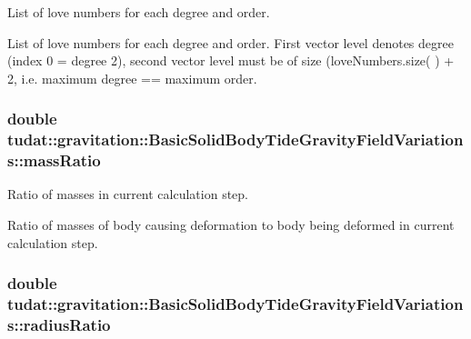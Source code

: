 List of love numbers for each degree and order. 

List of love numbers for each degree and order. First vector level denotes degree (index 0 = degree 2), second vector level must be of size (love\+Numbers.\+size( ) + 2, i.\+e. maximum degree == maximum order. 
\subsubsection[{\texorpdfstring{mass\+Ratio}{massRatio}}]{\setlength{\rightskip}{0pt plus 5cm}double tudat\+::gravitation\+::\+Basic\+Solid\+Body\+Tide\+Gravity\+Field\+Variations\+::mass\+Ratio\hspace{0.3cm}{\ttfamily [protected]}}\hypertarget{classtudat_1_1gravitation_1_1BasicSolidBodyTideGravityFieldVariations_a40b77e066ce4933eb7a4d9ca5fd27b76}{}\label{classtudat_1_1gravitation_1_1BasicSolidBodyTideGravityFieldVariations_a40b77e066ce4933eb7a4d9ca5fd27b76}


Ratio of masses in current calculation step. 

Ratio of masses of body causing deformation to body being deformed in current calculation step. 
\subsubsection[{\texorpdfstring{radius\+Ratio}{radiusRatio}}]{\setlength{\rightskip}{0pt plus 5cm}double tudat\+::gravitation\+::\+Basic\+Solid\+Body\+Tide\+Gravity\+Field\+Variations\+::radius\+Ratio\hspace{0.3cm}{\ttfamily [protected]}}\hypertarget{classtudat_1_1gravitation_1_1BasicSolidBodyTideGravityFieldVariations_a6ba4ba751b56f7f653a7370371f5ab21}{}\label{classtudat_1_1gravitation_1_1BasicSolidBodyTideGravityFieldVariations_a6ba4ba751b56f7f653a7370371f5ab21}


